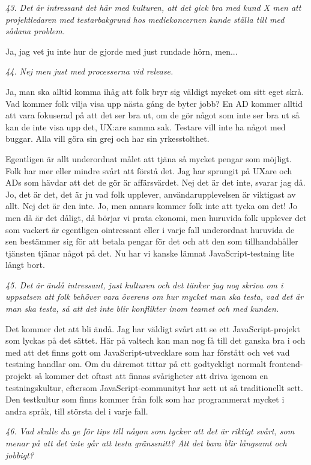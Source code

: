 \documentclass[11pt]{article}
\begin{document}
\emph{43. Det är intressant det här med kulturen, att det gick bra med kund X men att projektledaren med testarbakgrund hos mediekoncernen kunde ställa till med sådana problem.}

Ja, jag vet ju inte hur de gjorde med just rundade hörn, men...

\emph{44. Nej men just med processerna vid release.}

Ja, man ska alltid komma ihåg att folk bryr sig väldigt mycket om sitt eget skrå. Vad kommer folk vilja visa upp nästa gång de byter jobb? En AD kommer alltid att vara fokuserad på att det ser bra ut, om de gör något som inte ser bra ut så kan de inte visa upp det, UX:are samma sak. Testare vill inte ha något med buggar. Alla vill göra sin grej och har sin yrkesstolthet.

Egentligen är allt underordnat målet att tjäna så mycket pengar som möjligt. Folk har mer eller mindre svårt att förstå det. Jag har sprungit på UXare och ADs som hävdar att det de gör är affärsvärdet. Nej det är det inte, svarar jag då. Jo, det är det, det är ju vad folk upplever, användarupplevelsen är viktigast av allt. Nej det är den inte. Jo, men annars kommer folk inte att tycka om det! Jo men då är det dåligt, då börjar vi prata ekonomi, men huruvida folk upplever det som vackert är egentligen ointressant eller i varje fall underordnat huruvida de sen bestämmer sig för att betala pengar för det och att den som tillhandahåller tjänsten tjänar något på det. Nu har vi kanske lämnat JavaScript-testning lite långt bort.

\emph{45. Det är ändå intressant, just kulturen och det tänker jag nog skriva om i uppsatsen att folk behöver vara överens om hur mycket man ska testa, vad det är man ska testa, så att det inte blir konflikter inom teamet och med kunden.}

Det kommer det att bli ändå. Jag har väldigt svårt att se ett JavaScript-projekt som lyckas på det sättet. Här på valtech kan man nog få till det ganska bra i och med att det finns gott om JavaScript-utvecklare som har förstått och vet vad testning handlar om. Om du däremot tittar på ett godtyckligt normalt frontend-projekt så kommer det oftast att finnas svårigheter att driva igenom en testningskultur, eftersom JavaScript-communityt har sett ut så traditionellt sett. Den testkultur som finns kommer från folk som har programmerat mycket i andra språk, till största del i varje fall.

\emph{46. Vad skulle du ge för tips till någon som tycker att det är riktigt svårt, som menar på att det inte går att testa gränssnitt? Att det bara blir långsamt och jobbigt?}
\end{document}

